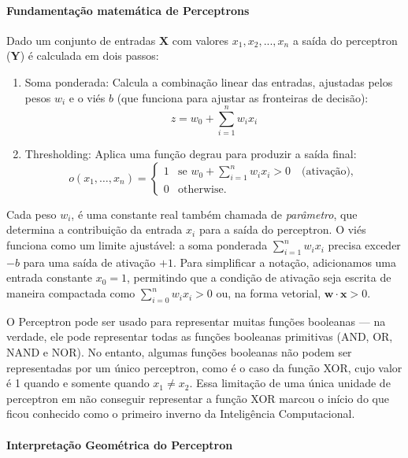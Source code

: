 \documentclass{tufte-handout}
\begin{document}
\paragraph{Fundamentação matemática de Perceptrons}

Dado um conjunto de entradas $\mathbf{X}$ com valores $x_1, x_2, ..., x_n$ a saída do perceptron ($\mathbf{Y}$) é calculada em dois passos:
\begin{enumerate}
    \item Soma ponderada: Calcula a combinação linear das entradas, ajustadas pelos pesos $w_i$ e o viés $b$ (que funciona para ajustar as fronteiras de decisão):
    \begin{equation}
        z = w_0 + \sum_{i=1}^{n}w_ix_i
    \end{equation}
    \item Thresholding: Aplica uma função degrau para produzir a saída final:
    \begin{equation} \label{perceptron}
    o(x_1, \dots, x_n) =
    \begin{cases}
    1 & \text{se } w_0 + \sum_{i=1}^n w_i x_i > 0 \quad \text{(ativação)}, \\ 0 & \text{otherwise.}
    \end{cases}
    \end{equation}
\end{enumerate}

Cada peso \( w_i \), é uma constante real também chamada de \textit{parâmetro}, que determina a contribuição da entrada $x_i$ para a saída do perceptron. O viés funciona como um limite ajustável: a soma ponderada $\sum_{i=1}^n w_i x_i$ precisa exceder $-b$ para uma saída de ativação $+1$. Para simplificar a notação, adicionamos uma entrada constante $x_0 = 1$, permitindo que a condição de ativação seja escrita de maneira compactada como $\sum_{i=0}^n w_i x_i > 0$ ou, na forma vetorial, $\mathbf{w} \cdot \mathbf{x} > 0$.

O Perceptron pode ser usado para representar muitas funções booleanas — na verdade, ele pode representar todas as funções booleanas primitivas (AND, OR, NAND e NOR). No entanto, algumas funções booleanas não podem ser representadas por um único perceptron, como é o caso da função XOR, cujo valor é 1 quando e somente quando $x_1 \neq x_2$. Essa limitação de uma única unidade de perceptron em não conseguir representar a função XOR marcou o início do que ficou conhecido como o primeiro inverno da Inteligência Computacional.


\paragraph{Interpretação Geométrica do Perceptron}
\end{document}

